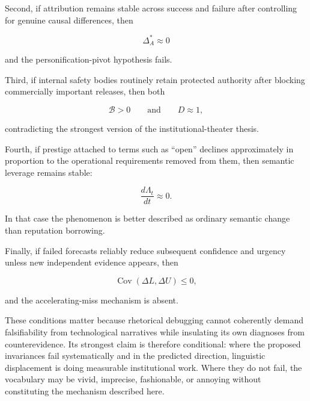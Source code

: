 \documentclass[11pt]{article}
\begin{document}
Second, if attribution remains stable across success and failure after
controlling for genuine causal differences, then

\[
\Delta_A^{*}\approx0
\]

and the personification-pivot hypothesis fails.

Third, if internal safety bodies routinely retain protected authority after
blocking commercially important releases, then both

\[
\mathcal B>0
\qquad\text{and}\qquad
D\approx1,
\]

contradicting the strongest version of the institutional-theater thesis.

Fourth, if prestige attached to terms such as ``open'' declines approximately
in proportion to the operational requirements removed from them, then
semantic leverage remains stable:

\[
\frac{d\Lambda_t}{dt}\approx0.
\]

In that case the phenomenon is better described as ordinary semantic change
than reputation borrowing.

Finally, if failed forecasts reliably reduce subsequent confidence and
urgency unless new independent evidence appears, then

\[
\operatorname{Cov}(\Delta L,\Delta U)\leq0,
\]

and the accelerating-miss mechanism is absent.

These conditions matter because rhetorical debugging cannot coherently demand
falsifiability from technological narratives while insulating its own
diagnoses from counterevidence. Its strongest claim is therefore conditional:
where the proposed invariances fail systematically and in the predicted
direction, linguistic displacement is doing measurable institutional work.
Where they do not fail, the vocabulary may be vivid, imprecise, fashionable,
or annoying without constituting the mechanism described here.

\newpage
\end{document}
